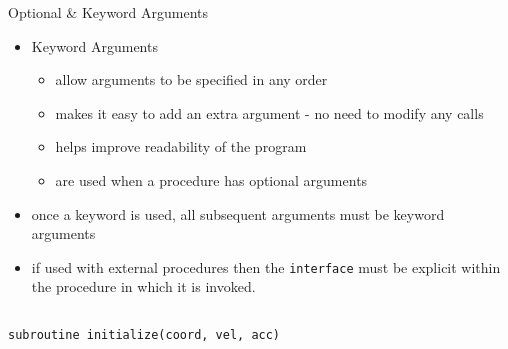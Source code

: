 \documentclass[c,mathserif,compress,xcolor=svgnames]{beamer}
\newcommand{\lstfortran}[1]{\lstinline[language={[90]Fortran},basicstyle=\footnotesize\ttfamily]|#1|}
\begin{document}
\begin{frame}{Optional \& Keyword Arguments}
\begin{itemize}
\begin{columns}[t]
\begin{lstlisting}[language={[90]Fortran},basicstyle=\fontsize{4}{5}\selectfont\ttfamily,mathescape]
        \end{lstlisting}
        \begin{lstlisting}[language={[90]Fortran},basicstyle=\fontsize{4}{5}\selectfont\ttfamily,mathescape]
subroutine initialize(coord_t0, vel_t0, acc_t0)
$\cdots$
  interface
     subroutine linearmom(vel)
       use precision
       implicit none
       real(dp), dimension(:,:), intent(inout) :: vel
     end subroutine linearmom
     subroutine get_temp(vel, boltz)
       use precision
       implicit none
       real(dp), dimension(:,:), intent(in) :: vel
       real(dp), optional :: boltz
     end subroutine get_temp
  end interface
$\cdots$
  call get_temp(vel_t0)
$\cdots$
        \end{lstlisting}
      \end{columns}
    \item Keyword Arguments
      \begin{itemize}
        \item allow arguments to be specified in any order
        \item makes it easy to add an extra argument - no need to modify any calls
        \item helps improve readability of the program
        \item are used when a procedure has optional arguments
      \end{itemize}
    \item once a keyword is used, all subsequent arguments must be keyword arguments
    \item if used with external procedures then the \lstfortran{interface} must be explicit within the procedure in which it is invoked.
  \end{itemize}

  \begin{columns}
    \column{5.5cm}
    \begin{lstlisting}[language={[90]Fortran},basicstyle=\fontsize{5}{6}\selectfont\ttfamily]
subroutine initialize(coord, vel, acc)


\end{lstlisting}
\end{columns}
\end{frame}
\end{document}
